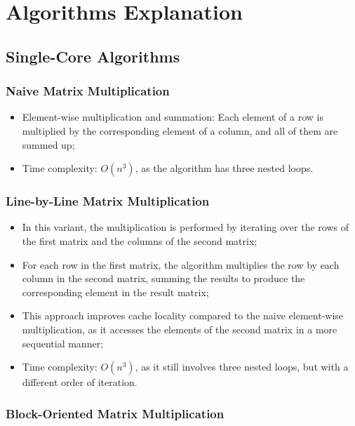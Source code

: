 \documentclass{article}
\begin{document}
\section{Algorithms Explanation}

\subsection{Single-Core Algorithms}

\subsubsection{Naive Matrix Multiplication}

\begin{itemize}
\item Element-wise multiplication and summation: Each element of a row is multiplied by the corresponding element of a column, and all of them are summed up;
\item Time complexity: $O(n^3)$, as the algorithm has three nested loops.
\end{itemize}

\subsubsection{Line-by-Line Matrix Multiplication}

\begin{itemize}
\item In this variant, the multiplication is performed by iterating over the rows of the first matrix and the columns of the second matrix;
\item For each row in the first matrix, the algorithm multiplies the row by each column in the second matrix, summing the results to produce the corresponding element in the result matrix;
\item This approach improves cache locality compared to the naive element-wise multiplication, as it accesses the elements of the second matrix in a more sequential manner;
\item Time complexity: $O(n^3)$, as it still involves three nested loops, but with a different order of iteration.
\end{itemize}

\subsubsection{Block-Oriented Matrix Multiplication}
\end{document}
